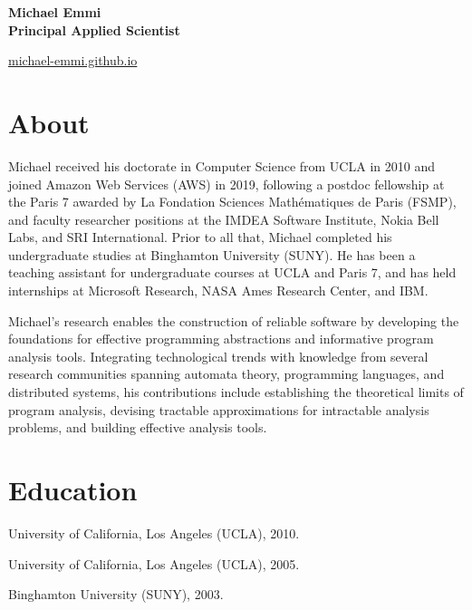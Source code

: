 \documentclass{article}
\begin{document}
  {\noindent\bfseries\Huge Michael Emmi} \\[1em]
  {\noindent\bfseries\Large Principal Applied Scientist} \\[1em]
  \noindent
  \begin{minipage}[t]{0.5\linewidth}
  \end{minipage}
  \begin{minipage}[t]{0.5\linewidth}
    \href{https://michael-emmi.github.io}{%
    michael-emmi.github.io} \\
    \href{%
    mailto:}{%
    }
  \end{minipage}

  \section*{About}


    Michael received his doctorate in Computer Science from UCLA in 2010 and joined Amazon Web Services (AWS) in 2019, following a postdoc fellowship at the Paris 7 awarded by La Fondation Sciences Mathématiques de Paris (FSMP), and faculty researcher positions at the IMDEA Software Institute, Nokia Bell Labs, and SRI International. Prior to all that, Michael completed his undergraduate studies at Binghamton University (SUNY). He has been a teaching assistant for undergraduate courses at UCLA and Paris 7, and has held internships at Microsoft Research, NASA Ames Research Center, and IBM.


    Michael’s research enables the construction of reliable software by developing the foundations for effective programming abstractions and informative program analysis tools. Integrating technological trends with knowledge from several research communities spanning automata theory, programming languages, and distributed systems, his contributions include establishing the theoretical limits of program analysis, devising tractable approximations for intractable analysis problems, and building effective analysis tools.


  \section*{Education}

  \begin{description}[leftmargin=0cm]

    \item[Ph.D. Computer Science.] University of California, Los Angeles (UCLA), 2010.


    \item[M.S. Computer Science.] University of California, Los Angeles (UCLA), 2005.


    \item[B.S. Computer Science.] Binghamton University (SUNY), 2003.

  \end{description}
\end{document}
